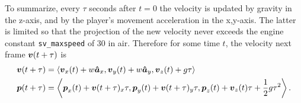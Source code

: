 To summarize, every $\tau$ seconds after $t=0$ the velocity is updated by gravity in the z-axis, and by the player's movement acceleration in the x,y-axis. The latter is limited so that the projection of the new velocity never exceeds the engine constant \verb|sv_maxspeed| of 30 in air. Therefore for some time $t$, the velocity next frame $\boldsymbol{v}(t+\tau)$ is
\begin{align*}
    \boldsymbol{v}(t+\tau) &= \left\langle \boldsymbol{v}_x(t) + w \boldsymbol{\hat{a}}_x, \boldsymbol{v}_y(t) + w\boldsymbol{\hat{a}}_y,\boldsymbol{v}_z(t) + g\tau \right\rangle\\
    \boldsymbol{p}(t+\tau) &= \left\langle \boldsymbol{p}_x(t) + \boldsymbol{v}(t+\tau)_x \tau, \boldsymbol{p}_y(t) + \boldsymbol{v}(t+\tau)_y \tau, \boldsymbol{p}_z(t) + \boldsymbol{v}_z(t)\tau + \frac{1}{2}g\tau^2 \right\rangle.
\end{align*}
